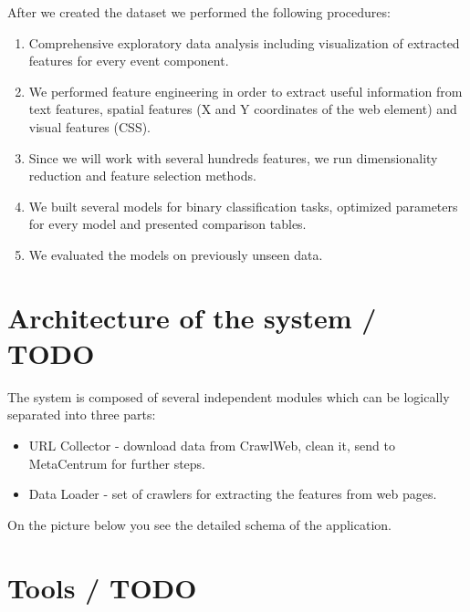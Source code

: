 After we created the dataset we performed the following procedures:
\begin{enumerate}
    \item Comprehensive exploratory data analysis including visualization of extracted features for every event component.
    \item We performed feature engineering in order to extract useful information from text features, spatial features (X and Y coordinates of the web element) and visual features (CSS). 
    \item Since we will work with several hundreds features, we run dimensionality reduction and feature selection methods. 
    \item We built several models for binary classification tasks, optimized parameters for every model and presented comparison tables.  
    \item We evaluated the models on previously unseen data.    
\end{enumerate}

\section{Architecture of the system / TODO}
\label{sec:arch}

The system is composed of several independent modules which can be logically separated into three parts:

\begin{itemize}
    \item URL Collector - download data from CrawlWeb, clean it, send to MetaCentrum for further steps.
    \item Data Loader - set of crawlers for extracting the features from web pages. 
\end{itemize}
On the picture below you see the detailed schema of the application. 
\section{Tools / TODO}

